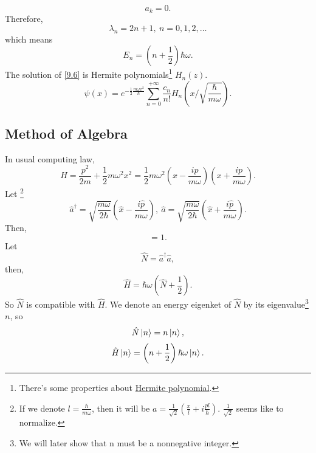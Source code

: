 \documentclass{article}
\theoremstyle{1}
\begin{document}
\begin{equation}
    a_{k}=0.
\end{equation}
Therefore, 
\begin{equation}
    \lambda_n=2n+1,\ n=0,1,2,\dots
\end{equation}
which means 
\begin{equation}
    E_n=\left(n+\frac{1}{2}\right)\hbar \omega.
\end{equation}
The solution of \eqref{9.6} is Hermite polynomials\footnote{There's some properties about \href{run:Hermite polynomial.pdf alias}{Hermite polynomial}.} $H_n(z)$.
\begin{equation}
    \psi(x)=e^{-\frac{1}{2}\frac{m\omega x^2}{\hbar}}\sum_{n=0}^{+\infty}\frac{c_n}{n!}H_n\left(x\slash\sqrt{\frac{\hbar}{m\omega}}\right).
\end{equation}


\subsection{Method of Algebra}
In usual computing law, 
\begin{equation}
    H=\frac{p^2}{2m}+\frac{1}{2}m\omega^2x^2=\frac{1}{2}m\omega^2\left(x-\frac{ip}{m\omega}\right)\left(x+\frac{ip}{m\omega}\right).
\end{equation}
Let \footnote{If we denote $l=\frac{\hbar}{m\omega}$, then it will be $a=\frac{1}{\sqrt{2}}\left(\frac{x}{l}+i\frac{pl}{\hbar}\right)$. $\frac{1}{\sqrt{2}}$ seems like to normalize.}
\begin{equation}
    \hat{a}^\dagger=\sqrt{\frac{m\omega}{2\hbar}}\left(\hat{x}-\frac{i\hat{p}}{m\omega}\right),\ \hat{a}=\sqrt{\frac{m\omega}{2\hbar}}\left(\hat{x}+\frac{i\hat{p}}{m\omega}\right).
\end{equation}
Then, 
\begin{equation}
    [\hat{a},\hat{a}^\dagger]=1.
\end{equation}
Let 
\begin{equation}
    \hat{N}=\hat{a}^\dagger\hat{a},
\end{equation}
then,
\begin{equation}
    \hat{H}=\hbar\omega \left(\hat{N}+\frac{1}{2}\right).
\end{equation}
So $\hat{N}$ is compatible with $\hat{H}$. We denote an energy eigenket of $\hat{N}$ by its eigenvalue\footnote{We will later show that n must be a nonnegative integer.} $n$, so
\begin{equation}
    \hat{N}\ket{n}=n\ket{n},
\end{equation}
\begin{equation}
    \hat{H}\ket{n}=\left(n+\frac{1}{2}\right)\hbar\omega\ket{n}.
\end{equation}
\end{document}
